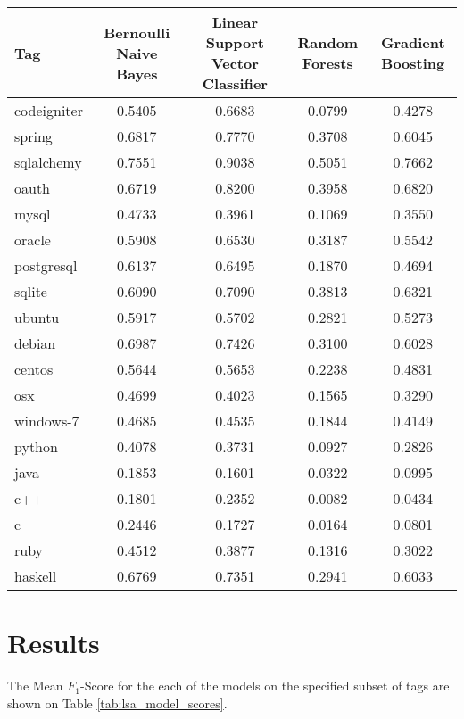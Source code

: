 \documentclass{sig-alternate}
\newcommand{\Fone}{$F_1$}
\begin{document}
\begin{table*}[htp]
	\centering
	\begin{tabular}{|l|c|c|c|c|}
		\hline
		\textbf{Tag} & \textbf{Bernoulli Naive Bayes} & \textbf{Linear Support Vector Classifier} & \textbf{Random Forests} & \textbf{Gradient Boosting} \\\hline
		codeigniter	& 0.5405	& 0.6683	& 0.0799	& 0.4278 \\\hline
		spring		& 0.6817	& 0.7770	& 0.3708	& 0.6045 \\\hline
		sqlalchemy	& 0.7551	& 0.9038	& 0.5051	& 0.7662 \\\hline
		oauth		& 0.6719	& 0.8200	& 0.3958	& 0.6820 \\\hline
		mysql		& 0.4733	& 0.3961	& 0.1069	& 0.3550 \\\hline
		oracle		& 0.5908	& 0.6530	& 0.3187	& 0.5542 \\\hline
		postgresql	& 0.6137	& 0.6495	& 0.1870	& 0.4694 \\\hline
		sqlite		& 0.6090	& 0.7090	& 0.3813	& 0.6321 \\\hline
		ubuntu		& 0.5917	& 0.5702	& 0.2821	& 0.5273 \\\hline
		debian		& 0.6987	& 0.7426	& 0.3100	& 0.6028 \\\hline
		centos		& 0.5644	& 0.5653	& 0.2238	& 0.4831 \\\hline
		osx			& 0.4699	& 0.4023	& 0.1565	& 0.3290 \\\hline
		windows-7	& 0.4685	& 0.4535	& 0.1844	& 0.4149 \\\hline
		python		& 0.4078	& 0.3731	& 0.0927	& 0.2826 \\\hline
		java		& 0.1853	& 0.1601	& 0.0322	& 0.0995 \\\hline
		c++			& 0.1801	& 0.2352	& 0.0082	& 0.0434 \\\hline
		c			& 0.2446	& 0.1727	& 0.0164	& 0.0801 \\\hline
		ruby		& 0.4512	& 0.3877	& 0.1316	& 0.3022 \\\hline
		haskell		& 0.6769	& 0.7351	& 0.2941	& 0.6033 \\\hline
	\end{tabular}
	\caption{Mean $F_1$-Scores of Models with Latent Semantic Analysis}
	\label{tab:lsa_model_scores}
\end{table*}

\section{Results} %
\label{sec:Results}
	The Mean \Fone-Score for the each of the models on the specified subset of
	tags are shown on Table \ref{tab:lsa_model_scores}. 
\end{document}
